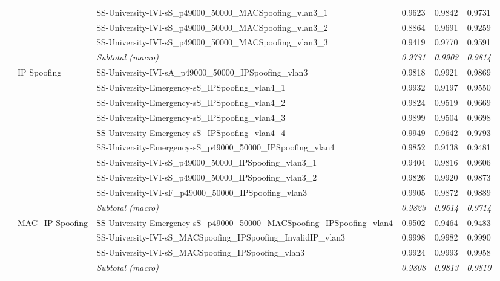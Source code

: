 \begin{table}[!tbp]
{\begin{tabular}{lllccc}
 & & SS-University-IVI-sS\_p49000\_50000\_MACSpoofing\_vlan3\_1   & 0.9623 & 0.9842 & 0.9731 \\
 & & SS-University-IVI-sS\_p49000\_50000\_MACSpoofing\_vlan3\_2   & 0.8864 & 0.9691 & 0.9259 \\
 & & SS-University-IVI-sS\_p49000\_50000\_MACSpoofing\_vlan3\_3   & 0.9419 & 0.9770 & 0.9591 \\
\addlinespace[2pt]
 & & \textit{Subtotal (macro)}                      & \textit{0.9731} & \textit{0.9902} & \textit{0.9814} \\
\cmidrule(l){2-6}
 & \multirow[c]{9}{*}{IP Spoofing}
 & SS-University-IVI-sA\_p49000\_50000\_IPSpoofing\_vlan3          & 0.9818 & 0.9921 & 0.9869 \\
 & & SS-University-Emergency-sS\_IPSpoofing\_vlan4\_1                & 0.9932 & 0.9197 & 0.9550 \\
 & & SS-University-Emergency-sS\_IPSpoofing\_vlan4\_2                & 0.9824 & 0.9519 & 0.9669 \\
 & & SS-University-Emergency-sS\_IPSpoofing\_vlan4\_3                & 0.9899 & 0.9504 & 0.9698 \\
 & & SS-University-Emergency-sS\_IPSpoofing\_vlan4\_4                & 0.9949 & 0.9642 & 0.9793 \\
 & & SS-University-Emergency-sS\_p49000\_50000\_IPSpoofing\_vlan4    & 0.9852 & 0.9138 & 0.9481 \\
 & & SS-University-IVI-sS\_p49000\_50000\_IPSpoofing\_vlan3\_1       & 0.9404 & 0.9816 & 0.9606 \\
 & & SS-University-IVI-sS\_p49000\_50000\_IPSpoofing\_vlan3\_2       & 0.9826 & 0.9920 & 0.9873 \\
 & & SS-University-IVI-sF\_p49000\_50000\_IPSpoofing\_vlan3          & 0.9905 & 0.9872 & 0.9889 \\
\addlinespace[2pt]
 & & \textit{Subtotal (macro)}                      & \textit{0.9823} & \textit{0.9614} & \textit{0.9714} \\
\cmidrule(l){2-6}
 & \multirow[c]{3}{*}{MAC+IP Spoofing}
 & SS-University-Emergency-sS\_p49000\_50000\_MACSpoofing\_IPSpoofing\_vlan4  & 0.9502 & 0.9464 & 0.9483 \\
 & & SS-University-IVI-sS\_MACSpoofing\_IPSpoofing\_InvalidIP\_vlan3            & 0.9998 & 0.9982 & 0.9990 \\
 & & SS-University-IVI-sS\_MACSpoofing\_IPSpoofing\_vlan3                       & 0.9924 & 0.9993 & 0.9958 \\
\addlinespace[2pt]
 & & \textit{Subtotal (macro)}                      & \textit{0.9808} & \textit{0.9813} & \textit{0.9810} \\

\end{tabular}}
\end{table}
